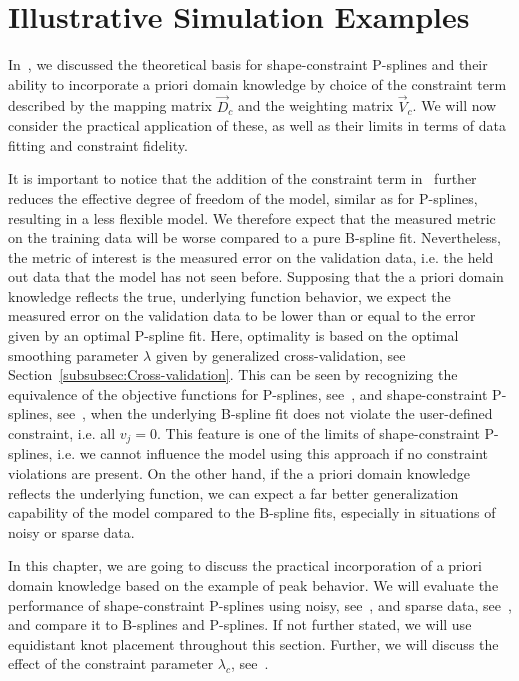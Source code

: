 \chapter{Illustrative Simulation Examples} \label{cha:practical-considerations}

In~, we discussed the theoretical basis for shape-constraint P-splines and their ability to incorporate a priori domain knowledge by choice of the constraint term described by the mapping matrix $\vec{D}_c$ and the weighting matrix $\vec{V}_c$. We will now consider the practical application of these, as well as their limits in terms of data fitting and constraint fidelity. 

It is important to notice that the addition of the constraint term in~ further reduces the effective degree of freedom of the model, similar as for P-splines, resulting in a less flexible model. We therefore expect that the measured metric on the training data will be worse compared to a pure B-spline fit. Nevertheless, the metric of interest is the measured error on the validation data, i.e. the held out data that the model has not seen before. Supposing that the a priori domain knowledge reflects the true, underlying function behavior, we expect the measured error on the validation data to be lower than or equal to the error given by an optimal P-spline fit. Here, optimality is based on the optimal smoothing parameter $\lambda$ given by generalized cross-validation, see Section~\ref{subsubsec:Cross-validation}. This can be seen by recognizing the equivalence of the objective functions for P-splines, see~, and shape-constraint P-splines, see~, when the underlying B-spline fit does not violate the user-defined constraint, i.e. all $v_j=0$. This feature is one of the limits of shape-constraint P-splines, i.e. we cannot influence the model using this approach if no constraint violations are present. On the other hand, if the a priori domain knowledge reflects the underlying function, we can expect a far better generalization capability of the model compared to the B-spline fits, especially in situations of noisy or sparse data.

In this chapter, we are going to discuss the practical incorporation of a priori domain knowledge based on the example of peak behavior. We will evaluate the performance of shape-constraint P-splines using noisy, see~, and sparse data, see~, and compare it to B-splines and P-splines. If not further stated, we will use equidistant knot placement throughout this section. Further, we will discuss the effect of the constraint parameter $\lambda_c$, see~.

